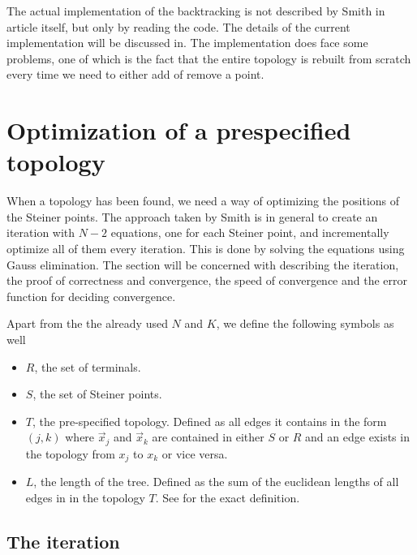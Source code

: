 The actual implementation of the backtracking is not described by Smith in
article itself, but only by reading the code. The details of the current
implementation will be discussed in. The implementation does face some problems, one of which is
the fact that the entire topology is rebuilt from scratch every time we need to
either add of remove a point.

\section{Optimization of a prespecified topology}
\label{sec:optim-presp-topol}

When a topology has been found, we need a way of optimizing the positions of the
Steiner points. The approach taken by Smith is in general to create an iteration
with $N-2$ equations, one for each Steiner point, and incrementally optimize all
of them every iteration. This is done by solving the equations using Gauss
elimination. The section will be concerned with describing the iteration, the
proof of correctness and convergence, the speed of convergence and the error
function for deciding convergence.

Apart from the the already used $N$ and $K$, we define the following symbols as
well
\begin{itemize}
\item $R$, the set of terminals.
\item $S$, the set of Steiner points.
\item $T$, the pre-specified topology. Defined as all edges it contains in the
  form $(j,k)$ where $\vec x_j$ and $\vec x_k$ are contained in either $S$ or
  $R$ and an edge exists in the topology from $x_j$ to $x_k$ or vice versa.
\item $L$, the length of the tree. Defined as the sum of the euclidean lengths
  of all edges in in the topology $T$. See  for the exact
  definition.
\end{itemize}


\subsection{The iteration}
\label{sec:iteration}

